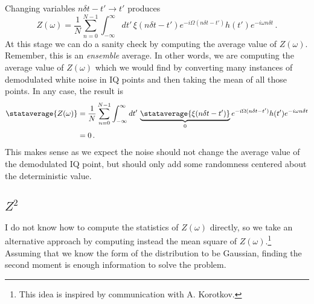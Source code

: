 Changing variables $n \delta t - t' \rightarrow t'$ produces
\begin{equation}
Z(\omega) = \frac{1}{N} \sum_{n=0}^{N-1} \int_{-\infty}^\infty dt' \, \xi(n \delta t - t') e^{-i \Omega (n \delta t - t')} h(t') e^{-i \omega n \delta t}  \, .
\end{equation}
At this stage we can do a sanity check by computing the average value of $Z(\omega)$.
Remember, this is an \emph{ensemble} average.
In other words, we are computing the average value of $Z(\omega)$ which we would find by converting many instances of demodulated white noise in IQ points and then taking the mean of all those points.
In any case, the result is
\begin{align}
\stataverage{Z(\omega)}
&= \frac{1}{N} \sum_{n=0}^{N-1} \int_{-\infty}^\infty dt' \, \underbrace{\stataverage{\xi(n \delta t - t')}}_0 e^{-i \Omega (n \delta t - t')} h(t') e^{-i \omega n \delta t} \\
&= 0 \, .
\end{align}
This makes sense as we expect the noise should not change the average value of the demodulated IQ point, but should only add some randomness centered about the deterministic value.

\subsection{$Z^2$}

I do not know how to compute the statistics of $Z(\omega)$ directly, so we take an alternative approach by computing instead the mean square of $Z(\omega)$.\footnote{This idea is inspired by communication with A. Korotkov.}
Assuming that we know the form of the distribution to be Gaussian, finding the second moment is enough information to solve the problem.

